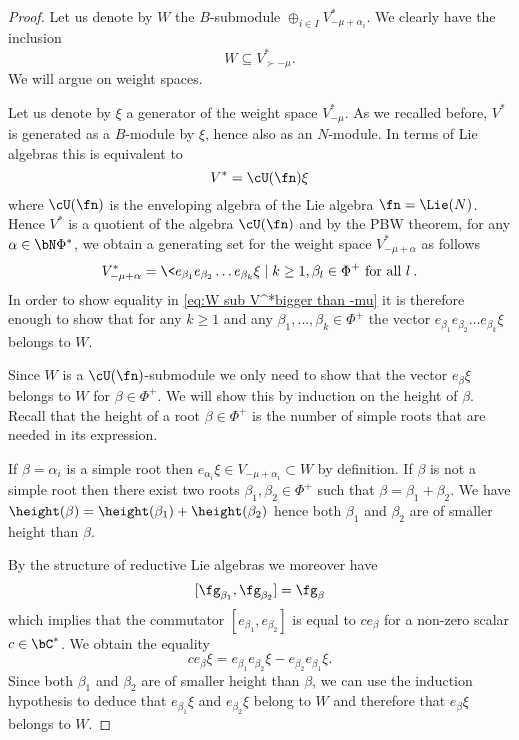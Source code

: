 \documentclass[reqno, 10pt]{amsart}
\theoremstyle{plain}
\theoremstyle{definition}
\numberwithin{equation}{section}%
\begin{document}
\begin{proof}
	Let us denote by $W$ the $B$-submodule $\oplus_{i\in I} V^*_{-\mu+\alpha_i}$.
	We clearly have the inclusion 
	\begin{equation}\label{eq:W sub V^*bigger than -mu}
			W\subseteq V^*_{\succ-\mu}.
	\end{equation}
	We will argue on weight spaces.

	Let us denote by $\xi$ a generator of the weight space $V^*_{-\mu}$.
	As we recalled before, $V^*$ is generated as a $B$-module by $\xi$, hence also as an $N$-module.
	In terms of Lie algebras this is equivalent to
	\[V^* = \cU(\fn)\xi\]
	where $\cU(\fn)$ is the enveloping algebra of the Lie algebra $\fn=\Lie(N)$.
	Hence $V^*$ is a quotient of the algebra $\cU(\fn)$
	and by the PBW theorem, for any $\alpha\in \bN\Phi^*$, we obtain a generating set for the weight space $V^*_{-\mu+\alpha}$ as follows
	\[
	V^*_{-\mu+\alpha} = \<e_{\beta_1}e_{\beta_2}\dots e_{\beta_k}\xi\mid k\ge 1, \beta_l\in\Phi^+\text{ for all }l\>. 
	\]
	In order to show equality in \eqref{eq:W sub V^*bigger than -mu} it is therefore enough to show that for any $k\ge 1$ and any $\beta_1,\dots,\beta_k\in\Phi^+$  the vector
	$e_{\beta_1}e_{\beta_2}\dots e_{\beta_k}\xi$ belongs to $W$.
	
	Since $W$ is a $\cU(\fn)$-submodule we only need to show that the vector $e_\beta\xi$ belongs to $W$ for $\beta\in\Phi^+$. We will show this by induction on the height of $\beta$. Recall that the height of a root $\beta\in\Phi^+$ is the number of simple roots that are needed in its expression.
	
	If $\beta=\alpha_i$ is a simple root then $e_{\alpha_i}\xi\in V_{-\mu+\alpha_i}\subset W$ by definition.
	If $\beta$ is not a simple root then there exist two roots $\beta_1,\beta_2\in\Phi^+$ such that 
	$\beta = \beta_1+\beta_2$. 
	We have $\height(\beta) = \height(\beta_1)+\height(\beta_2)$ hence both $\beta_1$ and $\beta_2$ are of smaller height than $\beta$.
	
	By the structure of reductive Lie algebras we moreover have
	\[ [\fg_{\beta_1},\fg_{\beta_2}] = \fg_{\beta} \]
	which implies that the commutator $[e_{\beta_1},e_{\beta_2}]$ is equal to $ce_\beta$ for a non-zero scalar $c\in\bC^*$.
	We obtain the equality
	\[ ce_\beta\xi = e_{\beta_1}e_{\beta_2}\xi-e_{\beta_2}e_{\beta_1}\xi.\]
	Since both $\beta_1$ and $\beta_2$ are of smaller height than $\beta$, we can use the induction hypothesis to deduce that $e_{\beta_1}\xi$ and $e_{\beta_2}\xi$ belong to $W$ and therefore that $e_\beta\xi$ belongs to $W$.
\end{proof}
\end{document}
